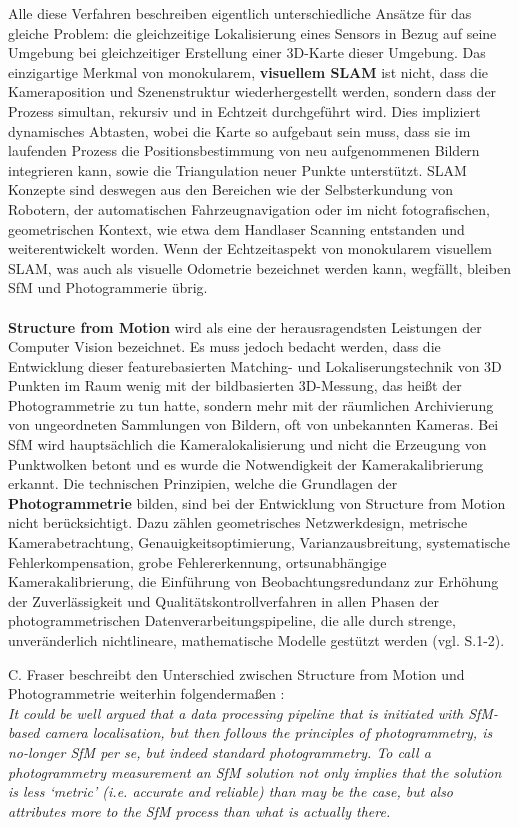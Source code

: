Alle diese Verfahren beschreiben eigentlich unterschiedliche Ansätze für das gleiche Problem: die gleichzeitige Lokalisierung eines Sensors in Bezug auf seine Umgebung bei gleichzeitiger Erstellung einer 3D-Karte dieser Umgebung. Das einzigartige Merkmal von monokularem, \textbf{visuellem SLAM} ist nicht, dass die Kameraposition und Szenenstruktur wiederhergestellt werden, sondern dass der Prozess simultan, rekursiv und in Echtzeit durchgeführt wird. Dies impliziert dynamisches Abtasten, wobei die Karte so aufgebaut sein muss, dass sie im laufenden Prozess die Positionsbestimmung von neu aufgenommenen Bildern integrieren kann, sowie die Triangulation neuer Punkte unterstützt. SLAM Konzepte sind deswegen aus den Bereichen wie der Selbsterkundung von Robotern, der automatischen Fahrzeugnavigation oder im nicht fotografischen, geometrischen Kontext, wie etwa dem Handlaser Scanning entstanden und weiterentwickelt worden. Wenn der Echtzeitaspekt von monokularem visuellem SLAM, was auch als visuelle Odometrie bezeichnet werden kann, wegfällt, bleiben SfM und Photogrammerie übrig. \\ \\ \textbf{Structure from Motion} wird als eine der herausragendsten Leistungen der Computer Vision bezeichnet. Es muss jedoch bedacht werden, dass die Entwicklung dieser featurebasierten Matching- und Lokaliserungstechnik von 3D Punkten im Raum wenig mit der bildbasierten 3D-Messung, das heißt der Photogrammetrie zu tun hatte, sondern mehr mit der räumlichen Archivierung von ungeordneten Sammlungen von Bildern, oft von unbekannten Kameras. Bei SfM wird hauptsächlich die Kameralokalisierung und nicht die Erzeugung von Punktwolken betont und es wurde die Notwendigkeit der Kamerakalibrierung erkannt. Die technischen Prinzipien, welche die Grundlagen der \textbf{Photogrammetrie} bilden, sind bei der Entwicklung von Structure from Motion nicht berücksichtigt. Dazu zählen geometrisches Netzwerkdesign, metrische Kamerabetrachtung, Genauigkeitsoptimierung, Varianzausbreitung, systematische Fehlerkompensation, grobe Fehlererkennung, ortsunabhängige Kamerakalibrierung, die Einführung von Beobachtungsredundanz zur Erhöhung der Zuverlässigkeit und Qualitätskontrollverfahren in allen Phasen der photogrammetrischen Datenverarbeitungspipeline, die alle durch strenge, unveränderlich nichtlineare, mathematische Modelle gestützt werden (vgl. \cite{vergleich_fraser} S.1-2).

C. Fraser beschreibt den Unterschied zwischen Structure from Motion und Photogrammetrie weiterhin folgendermaßen \cite{vergleich_fraser}: \\ \textit{ \glqq It could be well argued that a data processing pipeline that is initiated with SfM-based camera localisation, but then follows the principles of photogrammetry, is no-longer SfM per se, but indeed standard photogrammetry. To call a photogrammetry measurement an SfM solution not only implies that the solution is less ‘metric’ (i.e. accurate and reliable) than may be the case, but also attributes more to the SfM process than what is actually there.\grqq }

